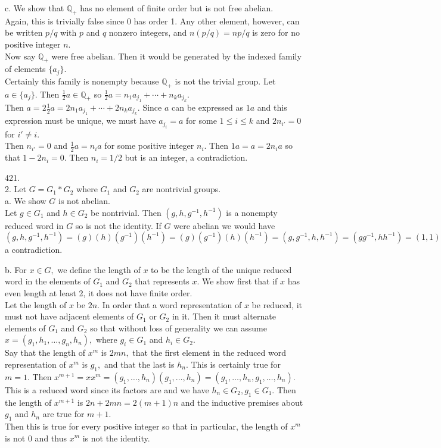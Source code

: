 \documentclass{article}
\begin{document}
c. We show that $\mathbb{Q}_+$ has no element of finite order but is not free abelian.
\\
Again, this is trivially false since $0$ has order 1.  Any other element, however, can be written $p/q$ with $p$ and $q$ nonzero integers, and $n(p/q)=np/q$ is zero for no positive integer $n.$
\\
Now say $\mathbb{Q}_+$ were free abelian.  Then it would be generated by the indexed family of elements $\{a_j\}.$
\\
Certainly this family is nonempty because $\mathbb{Q}_+$ is not the trivial group.   Let $a\in\{a_j\}.$ Then $\frac{1}{2}a\in\mathbb{Q}_+$ so $\frac{1}{2}a=n_1a_{j_1}+\cdots+n_ka_{j_k}.$
\\
Then $a=2\frac{1}{2}a=2n_1a_{j_1}+\cdots+2n_ka_{j_k}.$  Since $a$ can be expressed as $1a$ and this expression must be unique, we must have $a_{j_i}=a$ for some $1\le i\le k$ and $2n_{i'}=0$ for $i'\ne i.$
\\
Then $n_{i'}=0$ and $\frac{1}{2}a=n_ia$ for some positive integer $n_i.$  Then $1a=a=2n_ia$ so that $1-2n_i=0.$  Then $n_i=1/2$ but is an integer, a contradiction.

421.
\\2. Let $G=G_1*G_2$ where $G_1$ and $G_2$ are nontrivial groups.
\\a. We show $G$ is not abelian.
\\Let $g\in G_1$ and $h\in G_2$ be nontrivial.  Then $(g,h,g^{-1},h^{-1})$ is a nonempty reduced word in $G$ so is not the identity.  If $G$ were abelian we would have $(g,h,g^{-1},h^{-1})=(g)(h)(g^{-1})(h^{-1})=(g)(g^{-1})(h)(h^{-1})=(g,g^{-1},h,h^{-1})=(gg^{-1},hh^{-1})=(1,1)=(),$ a contradiction.

b. For $x\in G,$ we define the length of $x$ to be the length of the unique reduced word in the elements of $G_1$ and $G_2$ that represents $x.$  We show first that if $x$ has even length at least 2, it does not have finite order.
\\
Let the length of $x$ be $2n.$  In order that a word representation of $x$ be reduced, it must not have adjacent elements of $G_1$ or $G_2$ in it.  Then it must alternate elements of $G_1$ and $G_2$ so that without loss of generality we can assume $x=(g_1,h_1,\ldots,g_n,h_n),$ where $g_i\in G_1$ and $h_i\in G_2.$
\\
Say that the length of $x^m$ is $2mn,$ that the first element in the reduced word representation of $x^m$ is $g_1,$ and that the last is $h_n.$  This is certainly true for $m=1.$  Then $x^{m+1}=xx^m=(g_1,\ldots,h_n)(g_1,\ldots, h_n)=(g_1,\ldots,h_n,g_1,\ldots,h_n).$  This is a reduced word since its factors are and we have $h_n\in G_2,g_1\in G_1.$  Then the length of $x^{m+1}$ is $2n+2mn=2(m+1)n$ and the inductive premises about $g_1$ and $h_n$ are true for $m+1.$
\\
Then this is true for every positive integer so that in particular, the length of $x^m$ is not 0 and thus $x^m$ is not the identity.
\end{document}

